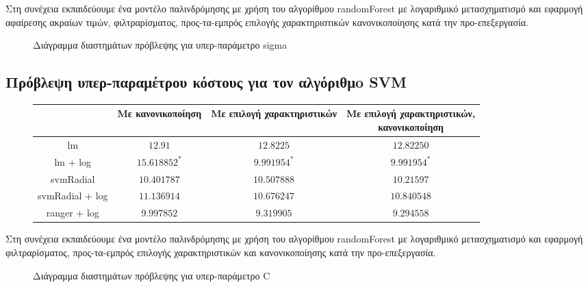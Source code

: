 Στη συνέχεια εκπαιδεύουμε ένα μοντέλο παλινδρόμησης με χρήση του αλγορίθμου randomForest με λογαριθμικό μετασχηματισμό και εφαρμογή αφαίρεσης ακραίων τιμών, φιλτραρίσματος, προς-τα-εμπρός επιλογής χαρακτηριστικών κανονικοποίησης κατά την προ-επεξεργασία.
\begin{figure}[!htb]
\scalebox{0.85}{
}
\caption[Διάγραμμα διαστημάτων πρόβλεψης για υπερ-παράμετρο sigma]{Διάγραμμα διαστημάτων πρόβλεψης για υπερ-παράμετρο sigma}
\end{figure}
\FloatBarrier
\subsection{Πρόβλεψη υπερ-παραμέτρου κόστους για τον αλγόριθμo \gls{SVM} }
\begin{figure}[!htb]
	\footnotesize
	\begin{center}
		\begin{tabular}{ |c|c|c|c| } 
			\hline
			& Με κανονικοποίηση & Με επιλογή χαρακτηριστικών & \pbox{20cm}{Με επιλογή χαρακτηριστικών,\\κανονικοποίηση} \\
			\hline
			lm & $12.91$  & $12.8225$ & $12.82250$  \\
			\hline
			lm + log & $15.618852^*$ & $9.991954 ^{*}$& $9.991954^*$ \\
			\hline
			svmRadial & $10.401787$ &$10.507888$& $10.21597$\\
			\hline
			svmRadial + log& $11.136914$ & $10.676247$& $10.840548$\\
			\hline
			ranger + log  & $9.997852$ & $9.319905$ & $\bm{9.294558}$\\
			\hline
		\end{tabular}   
	\end{center}
\end{figure}

Στη συνέχεια εκπαιδεύουμε ένα μοντέλο παλινδρόμησης με χρήση του αλγορίθμου randomForest με λογαριθμικό μετασχηματισμό και εφαρμογή φιλτραρίσματος, προς-τα-εμπρός επιλογής χαρακτηριστικών και κανονικοποίησης κατά την προ-επεξεργασία.

\begin{figure} [!htb]
	\scalebox{0.85}{
}
\caption[Διάγραμμα διαστημάτων πρόβλεψης για υπερ-παράμετρο C]{Διάγραμμα διαστημάτων πρόβλεψης για υπερ-παράμετρο C}
\end{figure}
\FloatBarrier
